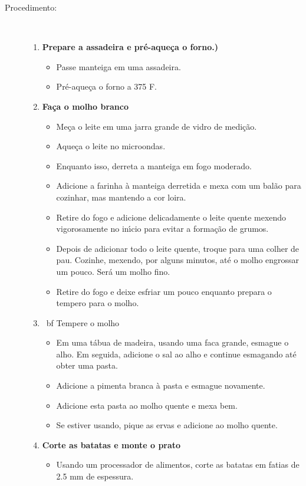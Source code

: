 \documentclass [11pt, letterpaper] {article}
\begin{document}
\begin {description}
\item[Procedimento:]\ \\
	\begin {enumerate}
	\item {\bf Prepare a assadeira e pr\'e-aque\c{c}a o forno.)}
		\begin {itemize}
		\item Passe manteiga em uma assadeira.
		\item Pr\'e-aque\c{c}a o forno a 375 F.
		\end {itemize}
	\item {\bf Fa\c{c}a o molho branco}
		\begin {itemize}
		\item Me\c{c}a o leite em uma jarra grande de vidro de medi\c{c}\~ao.
		\item Aque\c{c}a o leite no microondas.
		\item Enquanto isso, derreta a manteiga em fogo moderado.
		\item Adicione a farinha \`a manteiga derretida e mexa com um bal\~ao para cozinhar, mas mantendo a cor loira.
		\item Retire do fogo e adicione delicadamente o leite quente mexendo vigorosamente no in\'{\i}cio para evitar a forma\c{c}\~ao de grumos.
		\item Depois de adicionar todo o leite quente, troque para uma colher de pau. Cozinhe, mexendo, por alguns minutos, at\'e o molho engrossar um pouco. Ser\'a um molho fino.
		\item Retire do fogo e deixe esfriar um pouco enquanto prepara o tempero para o molho.
		\end {itemize}
	\item {\ bf Tempere o molho}
		\begin {itemize}
        		\item Em uma t\'abua de madeira, usando uma faca grande, esmague o alho. Em seguida, adicione o sal ao alho e continue esmagando at\'e obter uma pasta.
		\item Adicione a pimenta branca \`a pasta e esmague novamente.
		\item Adicione esta pasta ao molho quente e mexa bem.
		\item Se estiver usando, pique as ervas e adicione ao molho quente.
		\end {itemize}
	\item {\bf Corte as batatas e monte o prato}
		\begin {itemize}
        		\item Usando um processador de alimentos, corte as batatas em fatias de 2.5 mm de espessura.

\end{itemize}
\end{enumerate}
\end{description}
\end{document}
